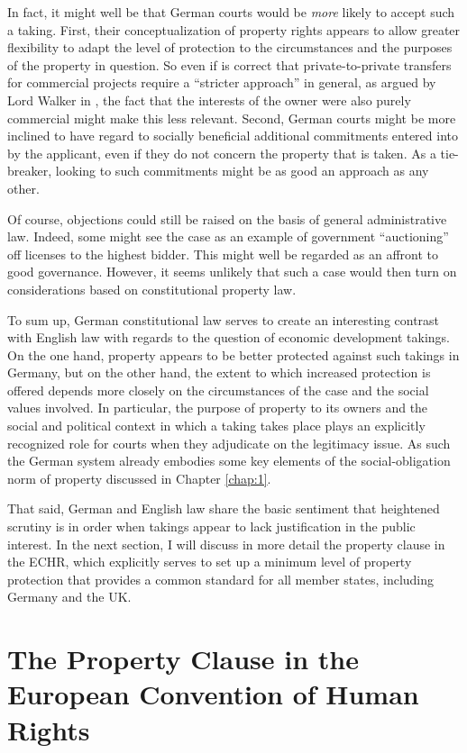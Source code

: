 In fact, it might well be that German courts would be {\it more} likely to accept such a taking. First, their conceptualization of property rights appears to allow greater flexibility to adapt the level of protection to the circumstances and the purposes of the property in question. So even if is correct that private-to-private transfers for commercial projects require a ``stricter approach'' in general, as argued by Lord Walker in , the fact that the interests of the owner were also purely commercial  might make this less relevant. Second, German courts might be more inclined to have regard to socially beneficial additional commitments entered into by the applicant, even if they do not concern the property that is taken. As a tie-breaker, looking to such commitments might be as good an approach as any other. 

Of course, objections could still be raised on the basis of general administrative law. Indeed, some might see the case as an example of government ``auctioning'' off licenses to the highest bidder. This might well be regarded as an affront to good governance. However, it seems unlikely that such a case would then turn on considerations based on constitutional property law.

To sum up, German constitutional law serves to create an interesting contrast with English law with regards to the question of economic development takings. On the one hand, property appears to be better protected against such takings in Germany, but on the other hand, the extent to which increased protection is offered depends more closely on the circumstances of the case and the social values involved. In particular, the purpose of property to its owners and the social and political context in which a taking takes place plays an explicitly recognized role for courts when they adjudicate on the legitimacy issue. As such the German system already embodies some key elements of the social-obligation norm of property discussed in Chapter \ref{chap:1}. 

That said, German and English law share the basic sentiment that heightened scrutiny is in order when takings appear to lack justification in the public interest. In the next section, I will discuss in more detail the property clause in the ECHR, which explicitly serves to set up a minimum level of property protection that provides a common standard for all member states, including Germany and the UK.

\section{The Property Clause in the European Convention of Human Rights}

